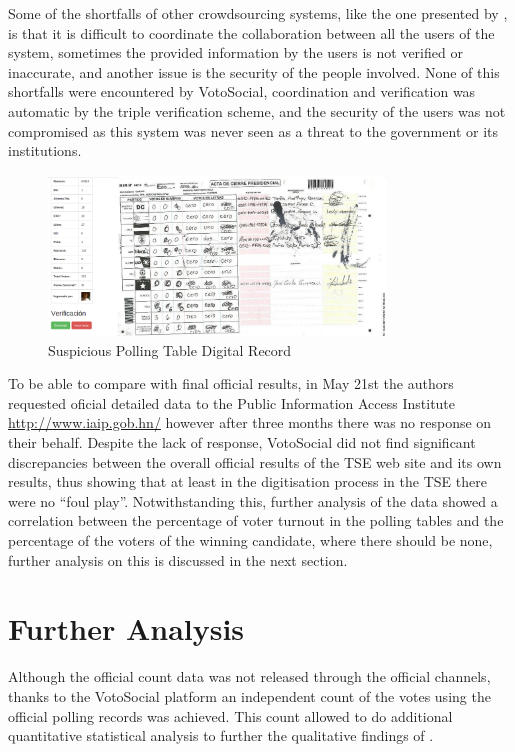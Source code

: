 \documentclass[letterpaper,10pt]{article}
\begin{document}
Some of the shortfalls of other crowdsourcing systems, like the one presented by \cite{gao2011}, is that it is difficult to coordinate the collaboration between all the users of the system, sometimes the provided information by the users is not verified or inaccurate, and another issue is the security of the people involved. None of this shortfalls were encountered by VotoSocial, coordination and verification was automatic by the triple verification scheme, and the security of the users was not compromised as this system was never seen as a threat to the government or its institutions.

\begin{figure}[h!]
    \centering
    \includegraphics[width=0.8\textwidth]{images/vs-valid-strange}
    \caption{Suspicious Polling Table Digital Record}
    \label{fig:strange}
\end{figure}

To be able to compare with final official results, in May 21st the authors requested oficial detailed data to the Public Information Access Institute \url{http://www.iaip.gob.hn/} however after three months there was no response on their behalf. Despite the lack of response, VotoSocial did not find significant discrepancies between the overall official results of the TSE web site and its own results, thus showing that at least in the digitisation process in the TSE there were no ``foul play''. Notwithstanding this, further analysis of the data showed a correlation between the percentage of voter turnout in the polling tables and the percentage of the voters of the winning candidate, where there should be none, further analysis on this is discussed in the next section.




\section{Further Analysis}

Although the official count data was not released through the official channels, thanks to the VotoSocial platform an independent count of the votes using the official polling records was achieved. This count allowed to do additional quantitative statistical analysis to further the qualitative findings of \cite{gonza2014}.
\end{document}
